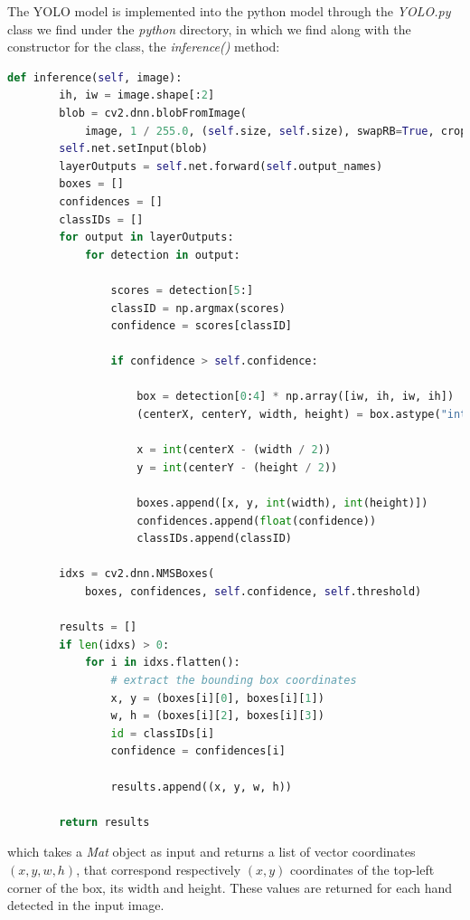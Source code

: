 The YOLO model is implemented into the python model through the
\textit{YOLO.py} class we find under the \textit{python} directory, in which we
find along with the constructor for
the class, the \textit{inference()} method:

\begin{lstlisting}[language = python]
    def inference(self, image):
        ih, iw = image.shape[:2]
        blob = cv2.dnn.blobFromImage(
            image, 1 / 255.0, (self.size, self.size), swapRB=True, crop=False)
        self.net.setInput(blob)
        layerOutputs = self.net.forward(self.output_names)
        boxes = []
        confidences = []
        classIDs = []
        for output in layerOutputs:
            for detection in output:

                scores = detection[5:]
                classID = np.argmax(scores)
                confidence = scores[classID]

                if confidence > self.confidence:

                    box = detection[0:4] * np.array([iw, ih, iw, ih])
                    (centerX, centerY, width, height) = box.astype("int")

                    x = int(centerX - (width / 2))
                    y = int(centerY - (height / 2))

                    boxes.append([x, y, int(width), int(height)])
                    confidences.append(float(confidence))
                    classIDs.append(classID)

        idxs = cv2.dnn.NMSBoxes(
            boxes, confidences, self.confidence, self.threshold)

        results = []
        if len(idxs) > 0:
            for i in idxs.flatten():
                # extract the bounding box coordinates
                x, y = (boxes[i][0], boxes[i][1])
                w, h = (boxes[i][2], boxes[i][3])
                id = classIDs[i]
                confidence = confidences[i]

                results.append((x, y, w, h))

        return results
\end{lstlisting}

which takes a \textit{Mat} object as input and returns a list of vector
coordinates $(x,y,w,h)$, that correspond respectively $(x,y)$
coordinates of the top-left corner of the box, its width and height. These
values are returned for each hand detected in the input image.

